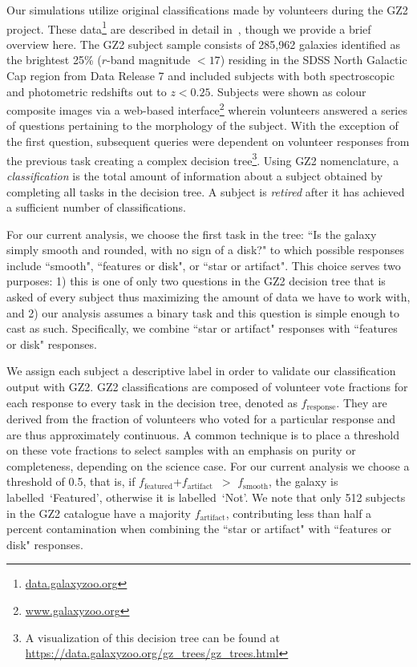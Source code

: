 \documentclass[twocolumn,  trackchanges,]{aastex6}%
\newcommand{\feat}{`Featured'}
\newcommand{\notfeat}{`Not'}
\newcommand{\ffeat}{$f_{\mathrm{featured}}$}
\newcommand{\fsmooth}{$f_{\mathrm{smooth}}$}
\newcommand{\fstar}{$f_{\mathrm{artifact}}$}
\begin{document}
Our simulations utilize original classifications made by volunteers during the
 GZ2 project. These data\footnote{\url{data.galaxyzoo.org}} are described in detail
 in~\cite{Willett2013}, though we provide a brief overview here.  The GZ2 subject sample
 consists of 285,962 galaxies identified as the brightest 25\% ($r$-band magnitude $< 17$)
 residing in the SDSS North Galactic Cap region from Data Release 7 and included 
subjects with both spectroscopic and photometric redshifts out to $z < 0.25$.
Subjects were shown as colour composite images via a web-based
 interface\footnote{\url{www.galaxyzoo.org}} wherein volunteers answered a 
series of questions pertaining to the morphology of the subject. With the exception 
of the first question, subsequent queries were dependent on volunteer responses 
from the previous task creating a complex decision tree\footnote{A visualization of this decision tree can be found at \url{https://data.galaxyzoo.org/gz_trees/gz_trees.html}}. Using GZ2 nomenclature, 
 a \textit{classification} is the total amount of information about a subject 
obtained by completing all tasks in the decision tree. A subject is \textit{retired} 
after it has achieved a sufficient number of classifications.


For our current analysis, we choose the first task in the tree: ``Is the galaxy simply 
smooth and rounded, with no sign of a disk?" to which possible responses include 
``smooth", ``features or disk", or ``star or artifact". This choice serves 
two purposes: 1) this is one of only two questions in the GZ2 decision tree that 
is asked of every subject thus maximizing the amount of data we have to work with, 
and 2) our analysis assumes a binary task and this question is simple enough to cast as such.
Specifically, we combine ``star or artifact" responses with ``features or disk" responses.

We assign each subject a descriptive label in order to validate our classification output with GZ2. GZ2 classifications are composed of volunteer vote fractions for each response to every task in the decision tree, denoted as $f_{\mathrm{response}}$. They are derived from the fraction of volunteers who voted for a particular response and are thus approximately continuous. A common technique is to place a threshold on these vote fractions to select samples with an emphasis on purity or completeness, depending on the science case. For our current analysis we choose a threshold of 0.5, that is, if \ffeat+\fstar~$ >$ \fsmooth, the galaxy is labelled~\feat, otherwise it is labelled~\notfeat. We note that only 512 subjects in the GZ2 catalogue have a majority \fstar, contributing less than half a percent contamination when combining the ``star or artifact" with ``features or disk" responses.
\end{document}
